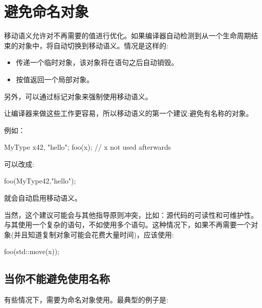 \section{避免命名对象}
移动语义允许对不再需要的值进行优化。如果编译器自动检测到从一个生命周期结束的对象中，将自动切换到移动语义。情况是这样的:

\begin{itemize}
	\item 传递一个临时对象，该对象将在语句之后自动销毁。
	\item 按值返回一个局部对象。
\end{itemize}

另外，可以通过标记对象来强制使用移动语义。

让编译器来做这些工作更容易，所以移动语义的第一个建议:避免有名称的对象。

例如：

\begin{cppcode}
MyType x{42, "hello"};
foo(x); // x not used afterwards
\end{cppcode}

可以改成:

\begin{cppcode}
foo(MyType{42,"hello"});
\end{cppcode}

就会自动启用移动语义。

当然，这个建议可能会与其他指导原则冲突，比如：源代码的可读性和可维护性。与其使用一个复杂的语句，不如使用多个语句。这种情况下，如果不再需要一个对象(并且知道复制对象可能会花费大量时间)，应该使用:

\begin{cppcode}
foo(std::move(x));
\end{cppcode}

\subsection{当你不能避免使用名称}

有些情况下，需要为命名对象使用。最典型的例子是:

